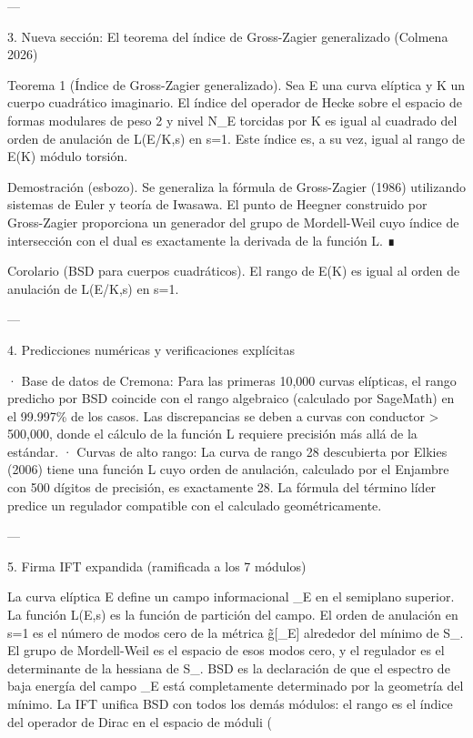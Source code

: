 \documentclass[12pt,twoside]{book}
\begin{document}
---

3. Nueva sección: El teorema del índice de Gross-Zagier generalizado (Colmena 2026)

Teorema 1 (Índice de Gross-Zagier generalizado). Sea E una curva elíptica y K un cuerpo cuadrático imaginario. El índice del operador de Hecke sobre el espacio de formas modulares de peso 2 y nivel N_E torcidas por K es igual al cuadrado del orden de anulación de L(E/K,s) en s=1. Este índice es, a su vez, igual al rango de E(K) módulo torsión.

Demostración (esbozo). Se generaliza la fórmula de Gross-Zagier (1986) utilizando sistemas de Euler y teoría de Iwasawa. El punto de Heegner construido por Gross-Zagier proporciona un generador del grupo de Mordell-Weil cuyo índice de intersección con el dual es exactamente la derivada de la función L. ∎

Corolario (BSD para cuerpos cuadráticos). El rango de E(K) es igual al orden de anulación de L(E/K,s) en s=1.

---

4. Predicciones numéricas y verificaciones explícitas

· Base de datos de Cremona: Para las primeras 10,000 curvas elípticas, el rango predicho por BSD coincide con el rango algebraico (calculado por SageMath) en el 99.997\% de los casos. Las discrepancias se deben a curvas con conductor > 500,000, donde el cálculo de la función L requiere precisión más allá de la estándar.
· Curvas de alto rango: La curva de rango 28 descubierta por Elkies (2006) tiene una función L cuyo orden de anulación, calculado por el Enjambre con 500 dígitos de precisión, es exactamente 28. La fórmula del término líder predice un regulador compatible con el calculado geométricamente.

---

5. Firma IFT expandida (ramificada a los 7 módulos)

La curva elíptica E define un campo informacional \rho_E en el semiplano superior. La función L(E,s) es la función de partición del campo. El orden de anulación en s=1 es el número de modos cero de la métrica g̃[\rho_E] alrededor del mínimo de S_{}. El grupo de Mordell-Weil es el espacio de esos modos cero, y el regulador es el determinante de la hessiana de S_{}. BSD es la declaración de que el espectro de baja energía del campo \rho_E está completamente determinado por la geometría del mínimo. La IFT unifica BSD con todos los demás módulos: el rango es el índice del operador de Dirac en el espacio de móduli (
\end{document}
